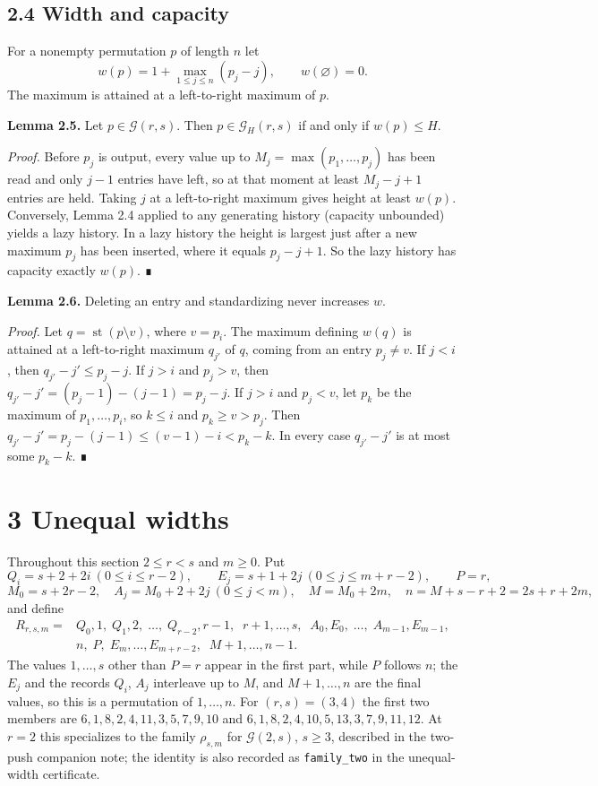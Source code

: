 \documentclass[11pt,letterpaper]{article}
\begin{document}
\subsection{2.4 Width and capacity}\label{width-and-capacity}

For a nonempty permutation \(p\) of length \(n\) let
\[w(p)=1+\max_{1\le j\le n}(p_j-j),\qquad w(\varnothing)=0 .\] The
maximum is attained at a left-to-right maximum of \(p\).

\textbf{Lemma 2.5.} Let \(p\in\mathcal G(r,s)\). Then
\(p\in\mathcal G_H(r,s)\) if and only if \(w(p)\le H\).

\emph{Proof.} Before \(p_j\) is output, every value up to
\(M_j=\max(p_1,\dots,p_j)\) has been read and only \(j-1\) entries have
left, so at that moment at least \(M_j-j+1\) entries are held. Taking
\(j\) at a left-to-right maximum gives height at least \(w(p)\).
Conversely, Lemma 2.4 applied to any generating history (capacity
unbounded) yields a lazy history. In a lazy history the height is
largest just after a new maximum \(p_j\) has been inserted, where it
equals \(p_j-j+1\). So the lazy history has capacity exactly \(w(p)\). ∎

\textbf{Lemma 2.6.} Deleting an entry and standardizing never increases
\(w\).

\emph{Proof.} Let \(q=\operatorname{st}(p\setminus v)\), where
\(v=p_i\). The maximum defining \(w(q)\) is attained at a left-to-right
maximum \(q_{j'}\) of \(q\), coming from an entry \(p_j\ne v\). If
\(j<i\), then \(q_{j'}-j'\le p_j-j\). If \(j>i\) and \(p_j>v\), then
\(q_{j'}-j'=(p_j-1)-(j-1)=p_j-j\). If \(j>i\) and \(p_j<v\), let \(p_k\)
be the maximum of \(p_1,\dots,p_i\), so \(k\le i\) and \(p_k\ge v>p_j\).
Then \(q_{j'}-j'=p_j-(j-1)\le(v-1)-i<p_k-k\). In every case
\(q_{j'}-j'\) is at most some \(p_k-k\). ∎

\section{3 Unequal widths}\label{unequal-widths}

Throughout this section \(2\le r<s\) and \(m\ge0\). Put
\[Q_i=s+2+2i\ (0\le i\le r-2),\qquad E_j=s+1+2j\ (0\le j\le m+r-2),\qquad P=r,\]
\[M_0=s+2r-2,\quad A_j=M_0+2+2j\ (0\le j<m),\quad M=M_0+2m,\quad n=M+s-r+2=2s+r+2m,\]
and define
\[\begin{aligned}R_{r,s,m}={}&Q_0,1,\;Q_1,2,\;\dots,\;Q_{r-2},r-1,\;\;r+1,\dots,s,\;\;A_0,E_0,\;\dots,\;A_{m-1},E_{m-1},\\&n,\;P,\;E_m,\dots,E_{m+r-2},\;\;M+1,\dots,n-1.\end{aligned}\]
The values \(1,\dots,s\) other than \(P=r\) appear in the first part,
while \(P\) follows \(n\); the \(E_j\) and the records \(Q_i\), \(A_j\)
interleave up to \(M\), and \(M+1,\dots,n\) are the final values, so
this is a permutation of \(1,\dots,n\). For \((r,s)=(3,4)\) the first
two members are \(6,1,8,2,4,11,3,5,7,9,10\) and
\(6,1,8,2,4,10,5,13,3,7,9,11,12\). At \(r=2\) this specializes to the
family \(\rho_{s,m}\) for \(\mathcal G(2,s)\), \(s\ge3\), described in
the two-push companion note; the identity is also recorded as
\texttt{family\_two} in the unequal-width certificate.
\end{document}

